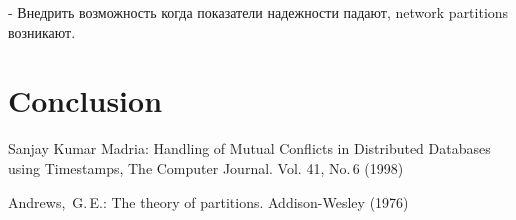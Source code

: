 \documentclass{llncs}
\begin{document}
- Внедрить возможность когда показатели надежности падают, network partitions возникают.


\section{Conclusion}

\begin{thebibliography}{00}

Sanjay Kumar Madria: 
Handling of Mutual Conflicts in Distributed Databases using Timestamps,
The Computer Journal. Vol. 41, No.\,6 (1998) 

Andrews,~G.\,E.:
The theory of partitions.
Addison-Wesley (1976)
\end{thebibliography}
\end{document}
